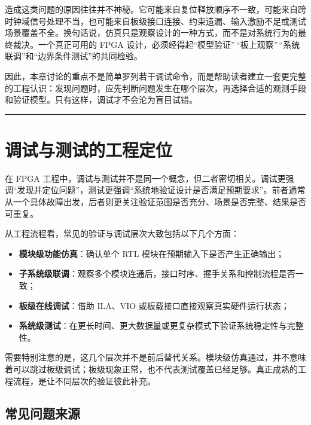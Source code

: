 造成这类问题的原因往往并不神秘。它可能来自复位释放顺序不一致，可能来自跨时钟域信号处理不当，也可能来自板级接口连接、约束遗漏、输入激励不足或测试场景覆盖不全。换句话说，仿真只是观察设计的一种方式，而不是对系统行为的最终裁决。一个真正可用的
FPGA
设计，必须经得起``模型验证''\,``板上观察''\,``系统联调''和``边界条件测试''的共同检验。

因此，本章讨论的重点不是简单罗列若干调试命令，而是帮助读者建立一套更完整的工程认识：发现问题时，应先判断问题发生在哪个层次，再选择合适的观测手段和验证模型。只有这样，调试才不会沦为盲目试错。

\begin{center}\rule{0.5\linewidth}{0.5pt}\end{center}

\section{调试与测试的工程定位}\label{ux8c03ux8bd5ux4e0eux6d4bux8bd5ux7684ux5de5ux7a0bux5b9aux4f4d}

在 FPGA
工程中，调试与测试并不是同一个概念，但二者密切相关。调试更强调``发现并定位问题''，测试更强调``系统地验证设计是否满足预期要求''。前者通常从一个具体故障出发，后者则更关注验证范围是否充分、场景是否完整、结果是否可重复。

从工程流程看，常见的验证与调试层次大致包括以下几个方面：

\begin{itemize}
\tightlist
\item
  \textbf{模块级功能仿真}：确认单个 RTL
  模块在预期输入下是否产生正确输出；
\item
  \textbf{子系统级联调}：观察多个模块连通后，接口时序、握手关系和控制流程是否一致；
\item
  \textbf{板级在线调试}：借助 ILA、VIO
  或板载接口直接观察真实硬件运行状态；
\item
  \textbf{系统级测试}：在更长时间、更大数据量或更复杂模式下验证系统稳定性与完整性。
\end{itemize}

需要特别注意的是，这几个层次并不是前后替代关系。模块级仿真通过，并不意味着可以跳过板级调试；板级现象正常，也不代表测试覆盖已经足够。真正成熟的工程流程，是让不同层次的验证彼此补充。

\subsection{常见问题来源}\label{ux5e38ux89c1ux95eeux9898ux6765ux6e90}

